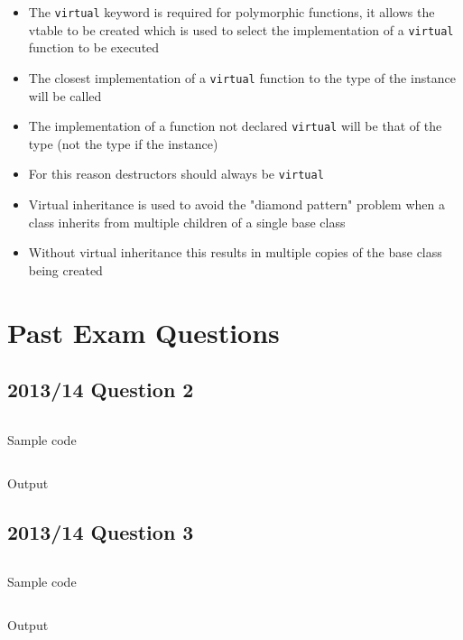 \documentclass[a4paper]{article}
\begin{document}
\begin{itemize}
  \item
    The \texttt{virtual} keyword is required for polymorphic functions, it
    allows the vtable to be created which is used to select the implementation
    of a \texttt{virtual} function to be executed

  \item
    The closest implementation of a \texttt{virtual} function to the type of the
    instance will be called

  \item
    The implementation of a function not declared \texttt{virtual} will be that
    of the type (not the type if the instance)

  \item
    For this reason destructors should always be \texttt{virtual}

  \item
    Virtual inheritance is used to avoid the "diamond pattern" problem when a
    class inherits from multiple children of a single base class

  \item
    Without virtual inheritance this results in multiple copies of the base
    class being created

\end{itemize}

\section{Past Exam Questions}

\subsection{2013/14 Question 2}

\begin{listing}[h!]
  \inputminted[linenos,frame=lines]{cpp}{listings/csc8501_pp1314_q2.cpp}
  \caption{Sample code}
  \label{listing:csc8501_pp1314_q2}
\end{listing}
\FloatBarrier

\begin{listing}[h!]
  \inputminted[linenos,frame=lines]{text}{out/csc8501_pp1314_q2.txt}
  \caption{Output}
  \label{listing:csc8501_pp1314_q2}
\end{listing}
\FloatBarrier

\subsection{2013/14 Question 3}

\begin{listing}[h!]
  \inputminted[linenos,frame=lines]{cpp}{listings/csc8501_pp1314_q3.cpp}
  \caption{Sample code}
  \label{listing:csc8501_pp1314_q3}
\end{listing}
\FloatBarrier

\begin{listing}[h!]
  \inputminted[linenos,frame=lines]{text}{out/csc8501_pp1314_q3.txt}
  \caption{Output}
  \label{listing:csc8501_pp1314_q3}
\end{listing}
\FloatBarrier
\end{document}
